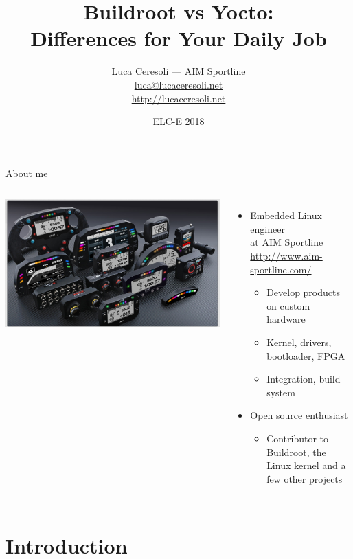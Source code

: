 \documentclass[xetex,table,aspectratio=169]{beamer}
\title{Buildroot vs Yocto:\\Differences for Your Daily Job}
\author{Luca Ceresoli --- AIM Sportline\\
  \href{mailto:luca@lucaceresoli.net}{luca@lucaceresoli.net}\\
  \url{http://lucaceresoli.net}
}
\date{ELC-E 2018}
\begin{document}
\maketitle

\begin{frame}{About me}
  \begin{columns}
    \includegraphics[width=\textwidth]{../common/images/aim-products.jpg}

    \begin{itemize}
    \item Embedded Linux engineer\\
      at AIM Sportline\\
      {\footnotesize\url{http://www.aim-sportline.com/}}
      \begin{itemize}
      \item Develop products on custom hardware
      \item Kernel, drivers, bootloader, FPGA
      \item Integration, build system
      \end{itemize}
    \item Open source enthusiast
      \begin{itemize}
      \item Contributor to Buildroot, the Linux kernel and a few other
        projects
      \end{itemize}
    \end{itemize}
  \end{columns}
\end{frame}


\section{Introduction}
\end{document}
